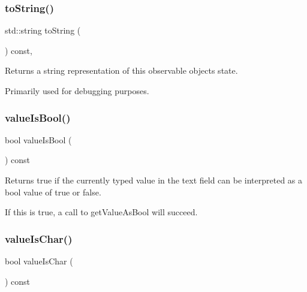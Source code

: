 \mbox{\label{classGObservable_a1fe5121d6528fdea3f243321b3fa3a49}} 
\subsubsection{\texorpdfstring{to\+String()}{toString()}}
{\footnotesize\ttfamily std\+::string to\+String (\begin{DoxyParamCaption}{ }\end{DoxyParamCaption}) const\hspace{0.3cm}{\ttfamily [virtual]}, {\ttfamily [inherited]}}



Returns a string representation of this observable object\textquotesingle{}s state. 

Primarily used for debugging purposes. \mbox{\label{classGTextField_a203f90275053ab957b1ea5a40dc3dd1e}} 
\subsubsection{\texorpdfstring{value\+Is\+Bool()}{valueIsBool()}}
{\footnotesize\ttfamily bool value\+Is\+Bool (\begin{DoxyParamCaption}{ }\end{DoxyParamCaption}) const\hspace{0.3cm}{\ttfamily [virtual]}}



Returns true if the currently typed value in the text field can be interpreted as a bool value of true or false. 

If this is true, a call to get\+Value\+As\+Bool will succeed. \mbox{\label{classGTextField_ac7a337b1e4c2f752a7f3fb634c92b442}} 
\subsubsection{\texorpdfstring{value\+Is\+Char()}{valueIsChar()}}
{\footnotesize\ttfamily bool value\+Is\+Char (\begin{DoxyParamCaption}{ }\end{DoxyParamCaption}) const\hspace{0.3cm}{\ttfamily [virtual]}}



